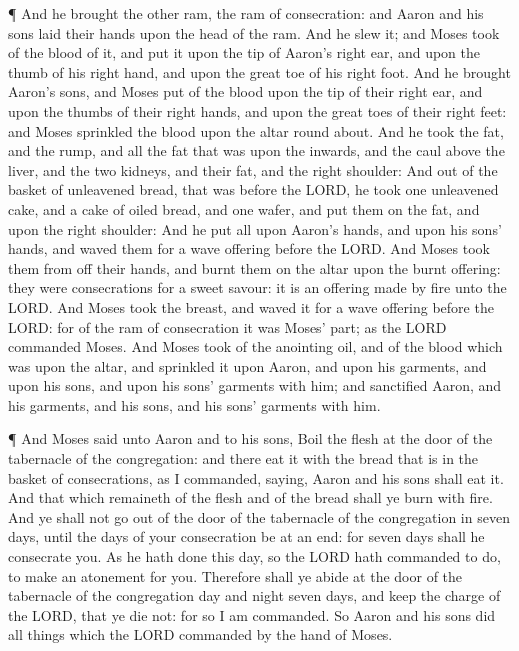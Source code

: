  ¶ And he brought the other ram, the ram of consecration:
and Aaron and his sons laid their hands upon the head of the ram.
 And he slew it; and Moses took of the blood of it, and put
it upon the tip of Aaron's right ear, and upon the thumb of his right
hand, and upon the great toe of his right foot.  And he
brought Aaron's sons, and Moses put of the blood upon the tip of their
right ear, and upon the thumbs of their right hands, and upon the great
toes of their right feet: and Moses sprinkled the blood upon the altar
round about.  And he took the fat, and the rump, and all
the fat that was upon the inwards, and the caul above the liver, and the
two kidneys, and their fat, and the right shoulder:  And
out of the basket of unleavened bread, that was before the LORD, he took
one unleavened cake, and a cake of oiled bread, and one wafer, and put
them on the fat, and upon the right shoulder:  And he put
all upon Aaron's hands, and upon his sons' hands, and waved them for a
wave offering before the LORD.  And Moses took them from
off their hands, and burnt them on the altar upon the burnt offering:
they were consecrations for a sweet savour: it is an offering made by
fire unto the LORD.  And Moses took the breast, and waved
it for a wave offering before the LORD: for of the ram of consecration
it was Moses' part; as the LORD commanded Moses.  And Moses
took of the anointing oil, and of the blood which was upon the altar,
and sprinkled it upon Aaron, and upon his garments, and upon his sons,
and upon his sons' garments with him; and sanctified Aaron, and his
garments, and his sons, and his sons' garments with him.

 ¶ And Moses said unto Aaron and to his sons, Boil the
flesh at the door of the tabernacle of the congregation: and there eat
it with the bread that is in the basket of consecrations, as I
commanded, saying, Aaron and his sons shall eat it.  And
that which remaineth of the flesh and of the bread shall ye burn with
fire.  And ye shall not go out of the door of the
tabernacle of the congregation in seven days, until the days of your
consecration be at an end: for seven days shall he consecrate you.
 As he hath done this day, so the LORD hath commanded to
do, to make an atonement for you.  Therefore shall ye abide
at the door of the tabernacle of the congregation day and night seven
days, and keep the charge of the LORD, that ye die not: for so I am
commanded.  So Aaron and his sons did all things which the
LORD commanded by the hand of Moses.

